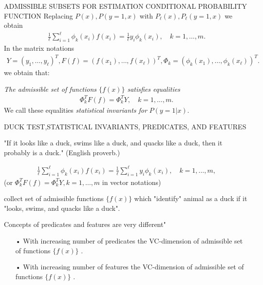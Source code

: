 \documentclass[11pt]{beamer}
\begin{document}
\begin{frame}{ADMISSIBLE SUBSETS FOR ESTIMATION CONDITIONAL PROBABILITY FUNCTION}
Replacing $P(x), P(y=1, x)$ with $P_{\ell}(x), P_{\ell}(y=1, x)$ we obtain
\begin{align*}
\frac{1}{\ell}\sum_{i=1}^{\ell}\phi_{k}(x_{i})f(x_{i}) = \frac{1}{\ell}y_{i}\phi_{k}(x_{i}), \quad k = 1,\ldots, m.
\end{align*}
In the matrix notations
\begin{align*}
Y = (y_{1}, \ldots, y_{\ell})^{T}, F(f) = (f(x_{1}), \ldots, f(x_{\ell}))^{T}, \Phi_{k} = (\phi_{k}(x_{1}), \ldots, \phi_{k}(x_{\ell}))^{T}.
\end{align*}
we obtain that:

\emph{The admissible set of functions $\{f(x)\}$ satisfies equalities}
\begin{align*}
\Phi_{k}^{T}F(f) = \Phi_{k}^{T}Y, \quad k = 1, \ldots, m.
\end{align*}
We call these equalities \emph{statistical invariants for} $P(y=1|x)$.
\end{frame}

\begin{frame}{DUCK TEST,STATISTICAL INVARIANTS, PREDICATES, AND FEATURES}

\centering{\color{blue}{THE DUCK TEST LOGIC}}

"If it looks like a duck, swims like a duck, and quacks like a duck, then it probably is a duck." (English proverb.)

\centering{\color{blue}{STATISTICAL INVARIANTS}}
\begin{align*}
\frac{1}{\ell}\sum_{i=1}^{\ell}\phi_{k}(x_{i})f(x_{i}) = \frac{1}{\ell}\sum_{i=1}^{\ell}y_{i}\phi_{k}(x_{i}), \quad k = 1, \ldots, m,
\end{align*}
(or $\Phi_{k}^{T}F(f) = \Phi_{k}^{T}Y, k = 1, \ldots, m$ in vector notations)

collect set of admissible functions $\{f(x)\}$ which "identify" animal as a duck if it "looks, swims, and quacks like a duck".

\centering{\color{blue}{PREDICATES AND FEATURES}}

Concepts of predicates and features are very different"
\begin{enumerate}
\item[•] With increasing number of predicates the VC-dimension of admissible set of functions $\{f(x)\}$ {\color{blue}{DECREASES}}.
\item[•] With increasing number of features the VC-dimension of admissible set of functions $\{f(x)\}$ {\color{blue}{INCREASES}}.
\end{enumerate}
\end{frame}
\end{document}
